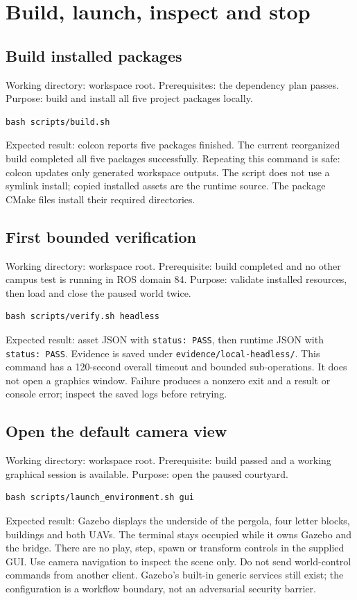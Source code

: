 \section{Build, launch, inspect and stop}
\subsection{Build installed packages}
Working directory: workspace root. Prerequisites: the dependency plan passes. Purpose: build and install all five project packages locally.
\begin{lstlisting}
bash scripts/build.sh
\end{lstlisting}
Expected result: colcon reports five packages finished. The current reorganized build completed all five packages successfully. Repeating this command is safe: colcon updates only generated workspace outputs. The script does not use a symlink install; copied installed assets are the runtime source. The package CMake files install their required directories.

\subsection{First bounded verification}
Working directory: workspace root. Prerequisite: build completed and no other campus test is running in ROS domain 84. Purpose: validate installed resources, then load and close the paused world twice.
\begin{lstlisting}
bash scripts/verify.sh headless
\end{lstlisting}
Expected result: asset JSON with \texttt{status: PASS}, then runtime JSON with \texttt{status: PASS}. Evidence is saved under \texttt{evidence/local-headless/}. This command has a 120-second overall timeout and bounded sub-operations. It does not open a graphics window. Failure produces a nonzero exit and a result or console error; inspect the saved logs before retrying.

\subsection{Open the default camera view}
Working directory: workspace root. Prerequisite: build passed and a working graphical session is available. Purpose: open the paused courtyard.
\begin{lstlisting}
bash scripts/launch_environment.sh gui
\end{lstlisting}
Expected result: Gazebo displays the underside of the pergola, four letter blocks, buildings and both UAVs. The terminal stays occupied while it owns Gazebo and the bridge. There are no play, step, spawn or transform controls in the supplied GUI. Use camera navigation to inspect the scene only. Do not send world-control commands from another client. Gazebo's built-in generic services still exist; the configuration is a workflow boundary, not an adversarial security barrier.

